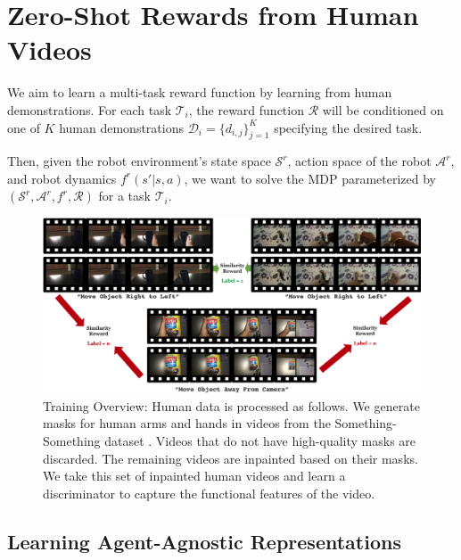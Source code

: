 \section{Zero-Shot Rewards from Human Videos}
\label{sec:method_reward}

We aim to learn a multi-task reward function by learning from human demonstrations. For each task $\mathcal{T}_i$, the reward function $\mathcal{R}$ will be conditioned on one of $K$ human demonstrations $\mathcal{D}_i = \{ d_{i,j} \}_{j=1}^K$ specifying the desired task. 

Then, given the robot environment's state space $\mathcal{S}^r$, action space of the robot $\mathcal{A}^r$, and robot dynamics $f^r(s' | s, a)$, we want to solve the MDP parameterized by $(\mathcal{S}^r, \mathcal{A}^r, f^r, \mathcal{R})$ for a task $\mathcal{T}_i$.

\begin{figure}[H]
\centering
\includegraphics[width=\linewidth]{figs_reward/method_overview.pdf}
\vspace{-0.2in}
   \caption{\small Training Overview: Human data is processed as follows. We generate masks for human arms and hands in videos from the Something-Something dataset \cite{smthsmth}. Videos that do not have high-quality masks are discarded. The remaining videos are inpainted based on their masks. We take this set of inpainted human videos and learn a discriminator to capture the functional features of the video.}
    \label{fig:method_reward}
    \vspace{-0.15in}
\end{figure}

\subsection{Learning Agent-Agnostic Representations}

